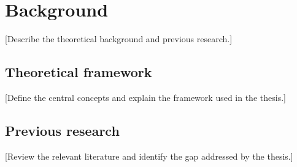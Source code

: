 \chapter{Background}
[Describe the theoretical background and previous research.]

\section{Theoretical framework}
[Define the central concepts and explain the framework used in the thesis.]

\section{Previous research}
[Review the relevant literature and identify the gap addressed by the thesis.]
